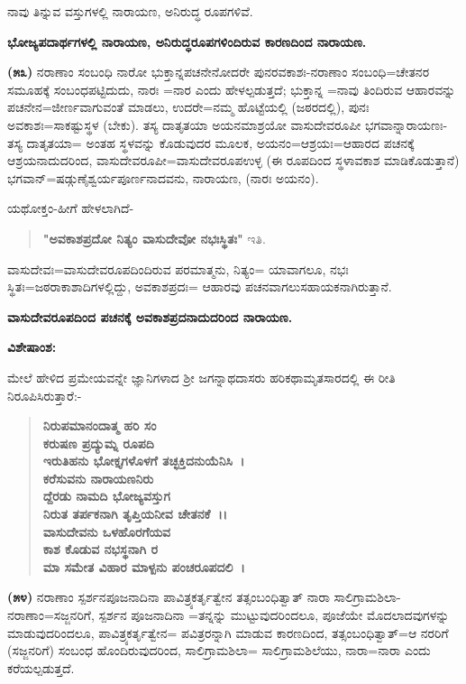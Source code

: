 \noindent
ನಾವು ತಿನ್ನುವ ವಸ್ತುಗಳಲ್ಲಿ ನಾರಾಯಣ, ಅನಿರುದ್ಧ ರೂಪಗಳಿವೆ.

\begin{center}
\textbf{ಭೋಜ್ಯಪದಾರ್ಥಗಳಲ್ಲಿ ನಾರಾಯಣ, ಅನಿರುದ್ಧರೂಪಗಳಿಂದಿರುವ ಕಾರಣದಿಂದ ನಾರಾಯಣ.}
\end{center}

\textbf{(೫೩)} ನರಾಣಾಂ ಸಂಬಂಧಿ ನಾರೋ ಭುಕ್ತಾನ್ನಪಚನೇನೋದರೇ ಪುನರವಕಾಶಃ-\-ನರಾಣಾಂ ಸಂಬಂಧಿ=ಚೇತನರ ಸಮೂಹಕ್ಕೆ ಸಂಬಂಧಪಟ್ಟಿದುದು, ನಾರಃ =ನಾರ ಎಂದು ಹೇಳಲ್ಪಡುತ್ತದೆ; ಭುಕ್ತಾನ್ನ =ನಾವು ತಿಂದಿರುವ ಆಹಾರವನ್ನು ಪಚನೇನ=ಜೀರ್ಣವಾಗುವಂತೆ ಮಾಡಲು, ಉದರೇ=ನಮ್ಮ ಹೊಟ್ಟೆಯಲ್ಲಿ (ಜಠರದಲ್ಲಿ), ಪುನಃ ಅವಕಾಶಃ=ಸಾಕಷ್ಟುಸ್ಥಳ (ಬೇಕು). ತಸ್ಯ ದಾತೃತಯಾ ಅಯನಮಾಶ್ರಯೋ ವಾಸುದೇವರೂಪೀ ಭಗವಾನ್ನಾರಾ\-ಯಣಃ-ತಸ್ಯ ದಾತೃತಯಾ= ಅಂತಹ ಸ್ಥಳವನ್ನು ಕೊಡುವುದರ ಮೂಲಕ, ಅಯನಂ=\break ಆಶ್ರಯಃ=ಆಹಾರದ ಪಚನಕ್ಕೆ ಆಶ್ರಯನಾದುದರಿಂದ, ವಾಸುದೇವರೂಪೀ=ವಾಸುದೇವ\-ರೂಪಉಳ್ಳ (ಈ ರೂಪದಿಂದ ಸ್ಥಳಾವಕಾಶ ಮಾಡಿಕೊಡುತ್ತಾನೆ) ಭಗವಾನ್=ಷಡ್ಗುಣೈಶ್ವರ್ಯ\-ಪೂರ್ಣನಾದ\-ವನು, ನಾರಾಯಣ, (ನಾರಃ ಅಯನಂ).

ಯಥೋಕ್ತಂ-ಹೀಗೆ ಹೇಳಲಾಗಿದೆ-

\begin{verse}
\textbf{"ಅವಕಾಶಪ್ರದೋ ನಿತ್ಯಂ ವಾಸುದೇವೋ ನಭಃಸ್ಥಿತಃ"} ಇತಿ.
\end{verse}

ವಾಸುದೇವಃ=ವಾಸುದೇವರೂಪದಿಂದಿರುವ ಪರಮಾತ್ಮನು, ನಿತ್ಯಂ= ಯಾವಾಗಲೂ, ನಭಃ ಸ್ಥಿತಃ=ಜಠರಾಕಾಶಾದಿಗಳಲ್ಲಿದ್ದು, ಅವಕಾಶಪ್ರದಃ= ಆಹಾರವು ಪಚನವಾಗಲು\break ಸಹಾಯಕನಾಗಿರುತ್ತಾನೆ.

\begin{center}
\textbf{ವಾಸುದೇವರೂಪದಿಂದ ಪಚನಕ್ಕೆ ಅವಕಾಶಪ್ರದನಾದುದರಿಂದ ನಾರಾಯಣ.}
\end{center}

\noindent
\textbf{ವಿಶೇಷಾಂಶ:\enginline{-}}

ಮೇಲೆ ಹೇಳಿದ ಪ್ರಮೇಯವನ್ನೇ ಜ್ಞಾನಿಗಳಾದ ಶ‍್ರೀ ಜಗನ್ನಾಥದಾಸರು ಹರಿಕಥಾಮೃತಸಾರದಲ್ಲಿ ಈ ರೀತಿ ನಿರೂಪಿಸಿರುತ್ತಾರೆ:-

\begin{verse}
\textbf{ನಿರುಪಮಾನಂದಾತ್ಮ ಹರಿ ಸಂ}\\\textbf{ಕರುಷಣ ಪ್ರದ್ಯುಮ್ನ ರೂಪದಿ}\\\textbf{ಇರುತಿಹನು ಭೋಕ್ತೃಗಳೊಳಗೆ ತಚ್ಛಕ್ತಿದನುಯೆನಿಸಿ~।}\\\textbf{ಕರೆಸುವನು ನಾರಾಯಣನಿರು}\\\textbf{ದ್ದೆರಡು ನಾಮದಿ ಭೋಜ್ಯವಸ್ತುಗ}\\\textbf{ನಿರುತ ತರ್ಪಕನಾಗಿ ತೃಪ್ತಿಯನೀವ ಚೇತನಕೆ~।।}\\\textbf{ವಾಸುದೇವನು ಒಳಹೊರಗೆಯವ}\\\textbf{ಕಾಶ ಕೊಡುವ ನಭಸ್ಥನಾಗಿ ರ\enginline{-}}\\\textbf{ಮಾ ಸಮೇತ ವಿಹಾರ ಮಾಳ್ಪನು ಪಂಚರೂಪದಲಿ~।}
\end{verse}

\textbf{(೫೪)} ನರಾಣಾಂ ಸ್ಪರ್ಶನಪೂಜನಾದಿನಾ ಪಾವಿತ್ರ್ಯಕರ್ತೃತ್ವೇನ ತತ್ಸಂಬಂಧಿತ್ವಾತ್ ನಾರಾ ಸಾಲಿಗ್ರಾಮಶಿಲಾ-ನರಾಣಾಂ=ಸಜ್ಜನರಿಗೆ, ಸ್ಪರ್ಶನ ಪೂಜನಾದಿನಾ =ತನ್ನನ್ನು ಮುಟ್ಟುವುದರಿಂದಲೂ, ಪೂಜೆಯೇ ಮೊದಲಾದವುಗಳನ್ನು ಮಾಡುವುದರಿಂದಲೂ, ಪಾವಿತ್ರ್ಯಕರ್ತೃತ್ವೇನ= ಪವಿತ್ರರನ್ನಾಗಿ ಮಾಡುವ ಕಾರಣದಿಂದ, ತತ್ಸಂಬಂಧಿತ್ವಾತ್=ಆ ನರರಿಗೆ (ಸಜ್ಜನರಿಗೆ) ಸಂಬಂಧ ಹೊಂದಿರುವುದರಿಂದ, ಸಾಲಿಗ್ರಾಮಶಿಲಾ= ಸಾಲಿಗ್ರಾಮಶಿಲೆಯು, ನಾರಾ=ನಾರಾ ಎಂದು ಕರೆಯಲ್ಪಡುತ್ತದೆ.

